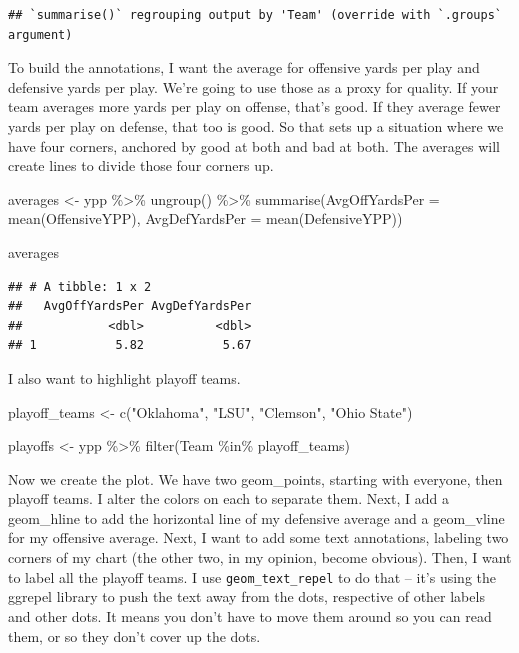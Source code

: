 \documentclass[
]{book}
\newenvironment{Shaded}{\begin{snugshade}}{\end{snugshade}}
\newcommand{\AttributeTok}[1]{\textcolor[rgb]{0.77,0.63,0.00}{#1}}
\newcommand{\FunctionTok}[1]{\textcolor[rgb]{0.00,0.00,0.00}{#1}}
\newcommand{\NormalTok}[1]{#1}
\newcommand{\OtherTok}[1]{\textcolor[rgb]{0.56,0.35,0.01}{#1}}
\newcommand{\SpecialCharTok}[1]{\textcolor[rgb]{0.00,0.00,0.00}{#1}}
\newcommand{\StringTok}[1]{\textcolor[rgb]{0.31,0.60,0.02}{#1}}
\begin{document}
\begin{verbatim}
## `summarise()` regrouping output by 'Team' (override with `.groups` argument)
\end{verbatim}

To build the annotations, I want the average for offensive yards per play and defensive yards per play. We're going to use those as a proxy for quality. If your team averages more yards per play on offense, that's good. If they average fewer yards per play on defense, that too is good. So that sets up a situation where we have four corners, anchored by good at both and bad at both. The averages will create lines to divide those four corners up.

\begin{Shaded}
\begin{Highlighting}[]
\NormalTok{averages }\OtherTok{\textless{}{-}}\NormalTok{ ypp }\SpecialCharTok{\%\textgreater{}\%} \FunctionTok{ungroup}\NormalTok{() }\SpecialCharTok{\%\textgreater{}\%} \FunctionTok{summarise}\NormalTok{(}\AttributeTok{AvgOffYardsPer =} \FunctionTok{mean}\NormalTok{(OffensiveYPP), }\AttributeTok{AvgDefYardsPer =} \FunctionTok{mean}\NormalTok{(DefensiveYPP))}

\NormalTok{averages}
\end{Highlighting}
\end{Shaded}

\begin{verbatim}
## # A tibble: 1 x 2
##   AvgOffYardsPer AvgDefYardsPer
##            <dbl>          <dbl>
## 1           5.82           5.67
\end{verbatim}

I also want to highlight playoff teams.

\begin{Shaded}
\begin{Highlighting}[]
\NormalTok{playoff\_teams }\OtherTok{\textless{}{-}} \FunctionTok{c}\NormalTok{(}\StringTok{"Oklahoma"}\NormalTok{, }\StringTok{"LSU"}\NormalTok{, }\StringTok{"Clemson"}\NormalTok{, }\StringTok{"Ohio State"}\NormalTok{)}

\NormalTok{playoffs }\OtherTok{\textless{}{-}}\NormalTok{ ypp }\SpecialCharTok{\%\textgreater{}\%} \FunctionTok{filter}\NormalTok{(Team }\SpecialCharTok{\%in\%}\NormalTok{ playoff\_teams)}
\end{Highlighting}
\end{Shaded}

Now we create the plot. We have two geom\_points, starting with everyone, then playoff teams. I alter the colors on each to separate them. Next, I add a geom\_hline to add the horizontal line of my defensive average and a geom\_vline for my offensive average. Next, I want to add some text annotations, labeling two corners of my chart (the other two, in my opinion, become obvious). Then, I want to label all the playoff teams. I use \texttt{geom\_text\_repel} to do that -- it's using the ggrepel library to push the text away from the dots, respective of other labels and other dots. It means you don't have to move them around so you can read them, or so they don't cover up the dots.
\end{document}
